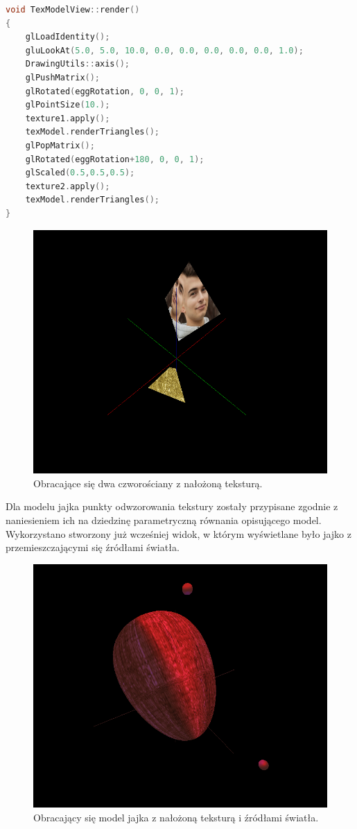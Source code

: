 \begin{lstlisting}[language=C++, caption=Metoda \lstinline{render} klasy \lstinline{TexModelView}., label={lst:texmodelview-render}]
void TexModelView::render()
{
    glLoadIdentity();
    gluLookAt(5.0, 5.0, 10.0, 0.0, 0.0, 0.0, 0.0, 0.0, 1.0);
    DrawingUtils::axis();
    glPushMatrix();
    glRotated(eggRotation, 0, 0, 1);
    glPointSize(10.);
    texture1.apply();
    texModel.renderTriangles();
    glPopMatrix();
    glRotated(eggRotation+180, 0, 0, 1);
    glScaled(0.5,0.5,0.5);
    texture2.apply();
    texModel.renderTriangles();
}
\end{lstlisting}

\begin{figure}[H]
    \centering
    \includegraphics[width=0.8\linewidth, trim={0cm 4cm 0cm 2cm},clip]{img/tex_1.png}
    \caption{Obracające się dwa czworościany z nałożoną teksturą.}
\end{figure}


Dla modelu jajka punkty odwzorowania tekstury zostały przypisane zgodnie z naniesieniem ich na dziedzinę parametryczną równania opisującego model. Wykorzystano stworzony już wcześniej widok, w którym wyświetlane było jajko z przemieszczającymi się źródłami światła.

\begin{figure}[H]
    \centering
    \includegraphics[width=0.8\linewidth, trim={0cm 2cm 0cm 1cm},clip]{img/tex_2.png}
    \caption{Obracający się model jajka z nałożoną teksturą i źródłami światła.}
\end{figure}

